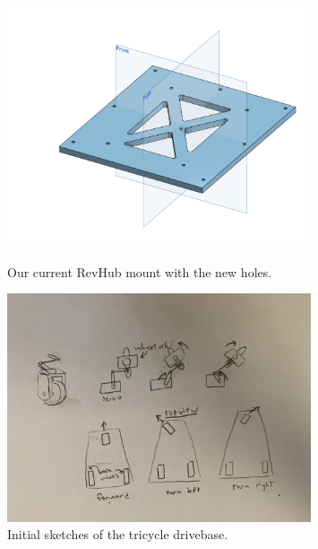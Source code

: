 \begin{figure}[ht]
\centering
\begin{minipage}[b]{.50\textwidth}
  \centering
  \includegraphics[width=0.8\textwidth]{Meetings/October/10-07-21/10-7-21_Hardware_Figure1 - Nathan Forrer.PNG}
  \caption{Our current RevHub mount with the new holes.}
  \label{fig:pic1}
\end{minipage}%
\hfill%
\begin{minipage}[b]{.50\textwidth}
  \centering
  \includegraphics[width=0.8\textwidth]{Meetings/October/10-07-21/10-7-21_Hardware_Figure2 - Nathan Forrer.JPG}
  \caption{Initial sketches of the tricycle drivebase.}
  \label{fig:pic2}
\end{minipage}
\end{figure}

